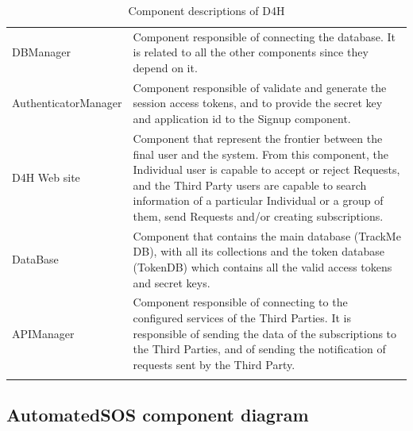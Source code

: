 \documentclass[a4paper, hidelinks, 12pt]{report}
\begin{document}
\begin{longtable}{l p{}}
			DBManager & Component responsible of connecting the database. It is related to all the other components since they depend on it.\\
			
			AuthenticatorManager & Component responsible of validate and generate the session access tokens, and to provide the secret key and application id to the Signup component.\\
			
			D4H Web site & Component that represent the frontier between the final user and the system. From this component, the Individual user is capable to accept or reject Requests, and the Third Party users are capable to search information of a particular Individual or a group of them, send Requests and/or creating subscriptions.\\
			
			DataBase & Component that contains the main database (TrackMe DB), with all its collections and the token database (TokenDB) which contains all the valid access tokens and secret keys.\\
			
			APIManager & Component responsible of connecting to the configured services of the Third Parties. It is responsible of sending the data of the subscriptions to the Third Parties, and of sending the notification of requests sent by the Third Party.\\
			
			\hline
			\caption{Component descriptions of D4H}
			\label{table:d4h_component_descriptions}
		\end{longtable}
			
			\subsection{AutomatedSOS component diagram}
\end{document}
